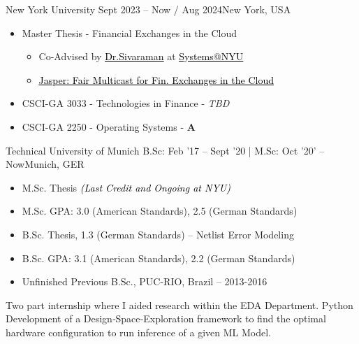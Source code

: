 \documentclass[10pt,a4paper,ragged2e,withhyper]{altacv}
\begin{document}
\begin{paracol}{2}

        {New York University}
        {Sept 2023 -- Now / Aug 2024}{New York, USA}
\begin{itemize}
\item Master Thesis - Financial Exchanges in the Cloud    
    \begin{itemize}
        \item Co-Advised by \href{https://anirudhsk.github.io/}{{\textcolor{black}{\underline{Dr.Sivaraman}}}} at \href{https://news.cs.nyu.edu/}{{\textcolor{black}{\underline{Systems@NYU}}}}
        \item \href{https://arxiv.org/abs/2402.09527}{{\textcolor{black}{\underline{Jasper: Fair Multicast for Fin. Exchanges in the Cloud}}}}
    \end{itemize}
\item CSCI-GA 3033  - Technologies in Finance - \textit{TBD}
\item CSCI-GA 2250  - Operating Systems - \textbf{A}
\end{itemize}

\divider

        {Technical University of Munich}
        {B.Sc: Feb '17 -- Sept '20 | M.Sc: Oct '20' -- Now}{Munich, GER}
\begin{itemize}
    \item M.Sc. Thesis {\textcolor{black}{\textit{(Last Credit and Ongoing at NYU)}}}
\item M.Sc. GPA: 3.0 (American Standards), 2.5 (German Standards) 
\item B.Sc. Thesis, 1.3 (German Standards) -- Netlist Error Modeling
\item B.Sc. GPA: 3.1 (American Standards), 2.2 (German Standards)
\item Unfinished Previous B.Sc., PUC-RIO, Brazil -- 2013-2016
\end{itemize}
\divider


Two part internship where I aided research within the EDA Department. Python Development of a Design‑Space‑Exploration 
framework to find the optimal hardware configuration to run inference of a given ML Model.


\end{paracol}
\end{document}
